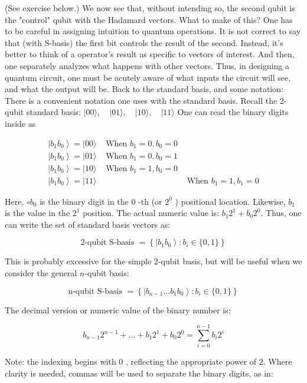 \documentclass[main.tex]{subfiles}
\begin{document}
    (See exercise below.) We now see that, without intending so, the second qubit is the "control" qubit with the Hadamard vectors. What to make of this? One has to be careful in assigning intuition to quantum operations. It is not correct to say that (with S-basis) the first bit controls the result of the second. Instead, it's better to think of a operator's result as specific to vectors of interest. And then, one separately analyzes what happens with other vectors. Thus, in designing a quantum circuit, one must be acutely aware of what inputs the circuit will see, and what the output will be. Back to the standard basis, and some notation: There is a convenient notation one uses with the standard basis. Recall the 2-qubit standard basis: $|00\rangle, \quad|01\rangle, \quad|10\rangle, \quad|11\rangle$ One can read the binary digits inside as
    
    $$
    \begin{array}{lll}
    \left|b_{1} b_{0}\right\rangle=|00\rangle & \text { When } b_{1}=0, b_{0}=0 \\
    \left|b_{1} b_{0}\right\rangle=|01\rangle & \text { When } b_{1}=0, b_{0}=1 \\
    \left|b_{1} b_{0}\right\rangle=|10\rangle & \text { When } b_{1}=1, b_{0}=0 \\
    \left|b_{1} b_{0}\right\rangle=|11\rangle & & \text { When } b_{1}=1, b_{1}=0
    \end{array}
    $$
    
    Here, $\circ b_{0}$ is the binary digit in the 0 -th (or $2^{0}$ ) positional location. Likewise, $b_{1}$ is the value in the $2^{1}$ position. The actual numeric value is: $b_{1} 2^{1}+b_{0} 2^{0}$. Thus, one can write the set of standard basis vectors as:
    
    $$
    2 \text {-qubit S-basis }=\left\{\left|b_{1} b_{0}\right\rangle: b_{i} \in\{0,1\}\right\}
    $$
    
    This is probably excessive for the simple 2-qubit basis, but will be useful when we consider the general $n$-qubit basis:
    
    $$
    \mathrm{n} \text {-qubit S-basis }=\left\{\left|b_{n-1} \ldots b_{1} b_{0}\right\rangle: b_{i} \in\{0,1\}\right\}
    $$
    
    The decimal version or numeric value of the binary number is:
    
    $$
    b_{n-1} 2^{n-1}+\ldots+b_{1} 2^{1}+b_{0} 2^{0}=\sum_{i=0}^{n-1} b_{i} 2^{i}
    $$
    
    Note: the indexing begins with 0 , reflecting the appropriate power of $2 .$ Where clarity is needed, commas will be used to separate the binary digits, as in:
    
\end{document}
